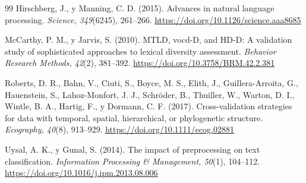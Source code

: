 \documentclass[11pt,a4paper]{article}
\begin{document}
\begin{thebibliography}{99}
Hirschberg, J., y Manning, C. D. (2015). Advances in natural language processing. \textit{Science, 349}(6245), 261--266. \url{https://doi.org/10.1126/science.aaa8685}

McCarthy, P. M., y Jarvis, S. (2010). MTLD, vocd-D, and HD-D: A validation study of sophisticated approaches to lexical diversity assessment. \textit{Behavior Research Methods, 42}(2), 381--392. \url{https://doi.org/10.3758/BRM.42.2.381}

Roberts, D. R., Bahn, V., Ciuti, S., Boyce, M. S., Elith, J., Guillera-Arroita, G., Hauenstein, S., Lahoz-Monfort, J. J., Schröder, B., Thuiller, W., Warton, D. I., Wintle, B. A., Hartig, F., y Dormann, C. F. (2017). Cross-validation strategies for data with temporal, spatial, hierarchical, or phylogenetic structure. \textit{Ecography, 40}(8), 913--929. \url{https://doi.org/10.1111/ecog.02881}

Uysal, A. K., y Gunal, S. (2014). The impact of preprocessing on text classification. \textit{Information Processing \& Management, 50}(1), 104--112. \url{https://doi.org/10.1016/j.ipm.2013.08.006}

\end{thebibliography}
\end{document}
